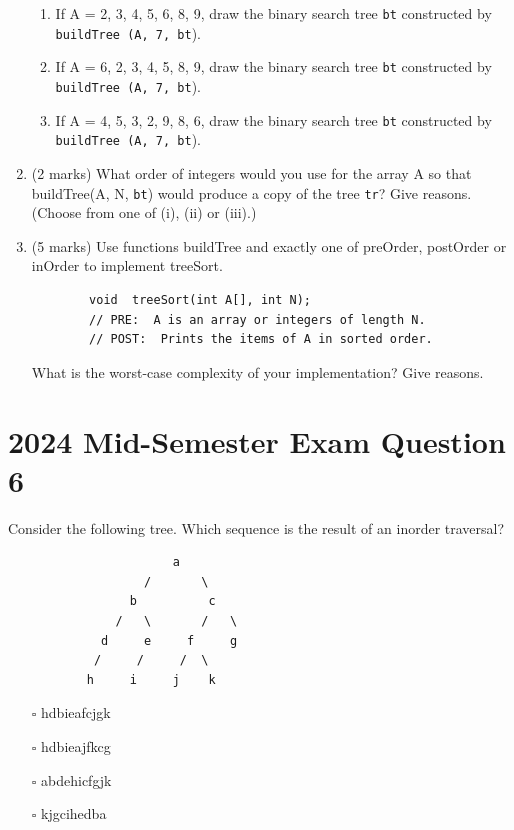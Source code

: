 \documentclass[twoside=false,DIV=14]{scrartcl}
\begin{document}
\begin{enumerate}
\begin{enumerate}
\item If A = {2, 3, 4, 5, 6, 8, 9}, draw the binary search tree \verb+bt+ constructed by \verb+buildTree (A, 7, bt+).
\item If A = {6, 2, 3, 4, 5, 8, 9}, draw the binary search tree \verb+bt+ constructed by \verb+buildTree (A, 7, bt+).
\item If A = {4, 5, 3, 2, 9, 8, 6}, draw the binary search tree \verb+bt+ constructed by \verb+buildTree (A, 7, bt+).
\end{enumerate}
\item (2 marks) What order of integers would you use for the array A so that buildTree(A, N, \verb+bt+) would produce a copy of the tree \verb+tr+? Give reasons. (Choose from one of (i), (ii) or (iii).)
\item (5 marks) Use functions buildTree and exactly one of preOrder, 
postOrder or inOrder to implement treeSort.
\begin{lstlisting}
        void  treeSort(int A[], int N);
        // PRE:  A is an array or integers of length N.
        // POST:  Prints the items of A in sorted order.
\end{lstlisting}
What is the worst-case complexity of your implementation? Give reasons.
\end{enumerate}
 
\section{2024 Mid-Semester Exam Question 6}
Consider the following tree. Which sequence is the result of an inorder traversal?           
\begin{verbatim}
                       a
                   /       \
                 b          c
               /   \       /   \
             d     e     f     g
            /     /     /  \
           h     i     j    k
\end{verbatim}
\begin{enumerate}
\item[$\square$] hdbieafcjgk
\item[$\square$] hdbieajfkcg
\item[$\square$] abdehicfgjk
\item[$\square$] kjgcihedba
\end{enumerate}
 
\end{document}
